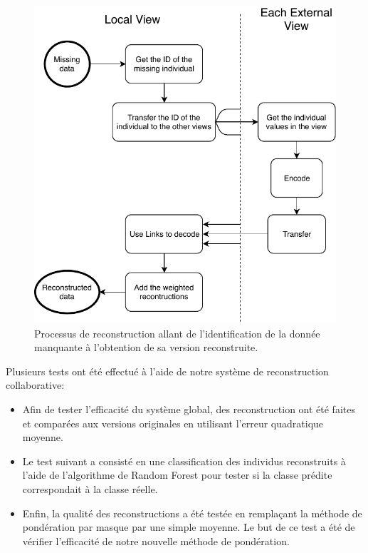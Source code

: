     \begin{figure}[h]
        \centering
        \includegraphics[scale=0.8]{img/process.pdf}
        \caption{Processus de reconstruction allant de l'identification de la donnée manquante à l'obtention de sa version reconstruite.}
\label{fig:sum_process}
    \end{figure}	

    Plusieurs tests ont été effectué à l'aide de notre système de reconstruction collaborative:
    \begin{itemize}
        \item Afin de tester l'efficacité du système global, des reconstruction ont été faites et comparées aux versions originales en utilisant l'erreur quadratique moyenne.
        \item Le test suivant a consisté en une classification des individus reconstruits à l'aide de l'algorithme de Random Forest pour tester si la classe prédite correspondait à la classe réelle.
        \item Enfin, la qualité des reconstructions a été testée en remplaçant la méthode de pondération par masque par une simple moyenne. Le but de ce test a été de vérifier l'efficacité de notre nouvelle méthode de pondération.
    \end{itemize}

